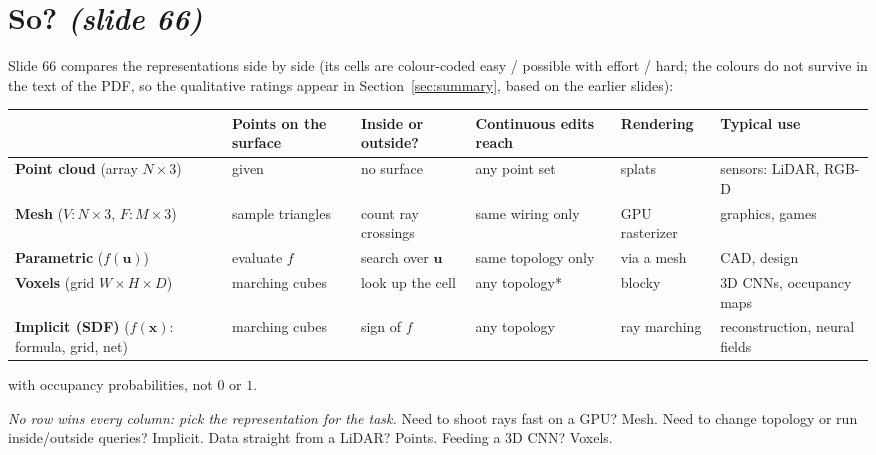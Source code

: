 \documentclass[11pt,a4paper]{article}
\newcommand{\vx}{\bm{x}}
\newcommand{\vu}{\bm{u}}
\theoremstyle{definition}
\theoremstyle{plain}
\theoremstyle{remark}
\newcommand{\slides}[1]{\texorpdfstring{\emph{(#1)}}{(#1)}}
\begin{document}
\section{So? \slides{slide 66}}
Slide 66 compares the representations side by side (its cells are colour-coded easy / possible with effort / hard; the colours do not survive in the text of the PDF, so the qualitative ratings appear in Section~\ref{sec:summary}, based on the earlier slides):

\begin{center}
\small
\renewcommand{\arraystretch}{1.25}
\setlength{\tabcolsep}{3pt}\begin{tabular}{L{2.2cm}L{2.4cm}L{2.3cm}L{2.4cm}L{2.1cm}L{2.5cm}}
\toprule
 & \textbf{Points on the surface} & \textbf{Inside or outside?} & \textbf{Continuous edits reach} & \textbf{Rendering} & \textbf{Typical use}\\
\midrule
\textbf{Point cloud} (array $N\times3$) & given & no surface & any point set & splats & sensors: LiDAR, RGB-D\\
\textbf{Mesh} ($V:N\times3$, $F:M\times3$) & sample triangles & count ray crossings & same wiring only & GPU rasterizer & graphics, games\\
\textbf{Parametric} ($f(\vu)$) & evaluate $f$ & search over $\vu$ & same topology only & via a mesh & CAD, design\\
\textbf{Voxels} (grid $W\times H\times D$) & marching cubes & look up the cell & any topology* & blocky & 3D CNNs, occupancy maps\\
\textbf{Implicit (SDF)} ($f(\vx)$: formula, grid, net) & marching cubes & sign of $f$ & any topology & ray marching & reconstruction, neural fields\\
\bottomrule
\end{tabular}
\end{center}
{\small * with occupancy probabilities, not $0$ or $1$.}

\begin{intuition}
\emph{No row wins every column: pick the representation for the task.} Need to shoot rays fast on a GPU? Mesh. Need to change topology or run inside/outside queries? Implicit. Data straight from a LiDAR? Points. Feeding a 3D CNN? Voxels.
\end{intuition}

\end{document}
